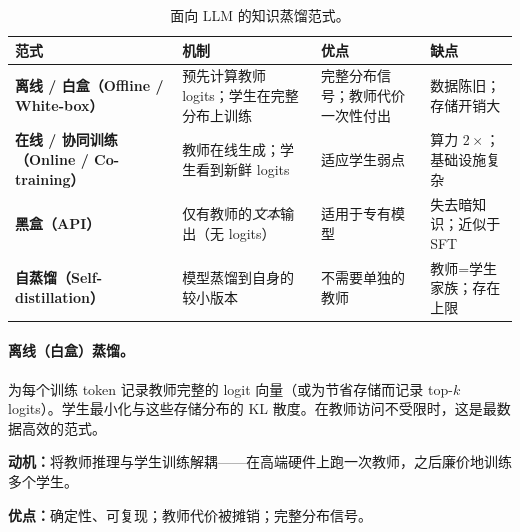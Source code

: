 \begin{table}[ht!]
\centering\small
\caption{面向 LLM 的知识蒸馏范式。}
\noindent\begin{tabularx}{\linewidth}{@{}Z{1.13} Z{1.25} Z{0.87} Z{0.75}@{}}
\toprule
\textbf{范式} & \textbf{机制} & \textbf{优点} & \textbf{缺点} \\
\midrule
\textbf{离线 / 白盒（Offline / White-box）} & 预先计算教师 logits；学生在完整分布上训练 & 完整分布信号；教师代价一次性付出 & 数据陈旧；存储开销大 \\
\textbf{在线 / 协同训练（Online / Co-training）} & 教师在线生成；学生看到新鲜 logits & 适应学生弱点 & 算力 $2\times$；基础设施复杂 \\
\textbf{黑盒（API）} & 仅有教师的\emph{文本}输出（无 logits） & 适用于专有模型 & 失去暗知识；近似于 SFT \\
\textbf{自蒸馏（Self-distillation）} & 模型蒸馏到自身的较小版本 & 不需要单独的教师 & 教师=学生家族；存在上限 \\
\bottomrule
\end{tabularx}
\end{table}

\paragraph{离线（白盒）蒸馏。}
\label{offline-white-box-distillation.}

为每个训练 token 记录教师完整的 logit 向量（或为节省存储而记录 top-$k$ logits）。学生最小化与这些存储分布的 KL 散度。在教师访问不受限时，这是最数据高效的范式。

\textbf{动机：}将教师推理与学生训练解耦——在高端硬件上跑一次教师，之后廉价地训练多个学生。

\textbf{优点：}确定性、可复现；教师代价被摊销；完整分布信号。\\

